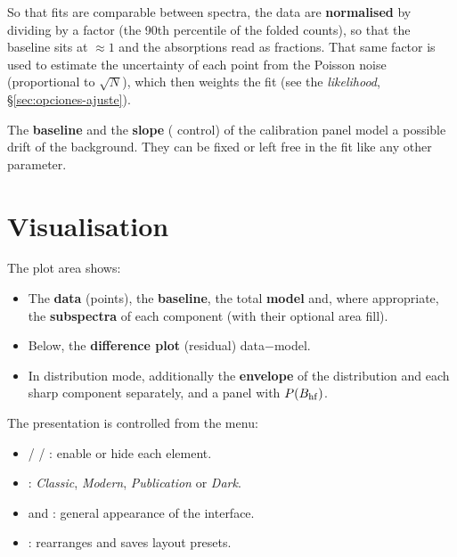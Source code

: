 So that fits are comparable between spectra, the data are \textbf{normalised} by
dividing by a factor (the 90th percentile of the folded counts), so that the
baseline sits at $\approx 1$ and the absorptions read as fractions. That same
factor is used to estimate the uncertainty of each point from the Poisson noise
(proportional to $\sqrt{N}$), which then weights the fit (see the
\emph{likelihood}, §\ref{sec:opciones-ajuste}).

\begin{nota}
The \textbf{baseline} and the \textbf{slope} ( control) of the
calibration panel model a possible drift of the background. They can be fixed or
left free in the fit like any other parameter.
\end{nota}

\section{Visualisation}

The plot area shows:

\begin{itemize}[nosep]
  \item The \textbf{data} (points), the \textbf{baseline}, the total
        \textbf{model} and, where appropriate, the \textbf{subspectra} of each
        component (with their optional area fill).
  \item Below, the \textbf{difference plot} (residual) data$-$model.
  \item In distribution mode, additionally the \textbf{envelope} of the
        distribution and each sharp component separately, and a panel with
        $P(B_{\mathrm{hf}})$.
\end{itemize}

The presentation is controlled from the  menu:

\begin{itemize}[nosep]
  \item {} /  /
        : enable or hide each element.
  \item {}: \emph{Classic}, \emph{Modern},
        \emph{Publication} or \emph{Dark}.
  \item {} and : general appearance of
        the interface.
  \item {}: rearranges and saves layout
        presets.
\end{itemize}

